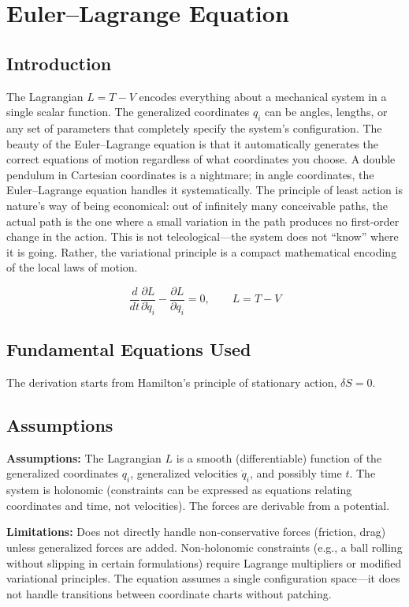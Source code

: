 \chapter{Euler--Lagrange Equation}

\section*{Introduction}

The Lagrangian $L = T - V$ encodes everything about a mechanical system in a single scalar function. The generalized coordinates $q_i$ can be angles, lengths, or any set of parameters that completely specify the system's configuration. The beauty of the Euler--Lagrange equation is that it automatically generates the correct equations of motion regardless of what coordinates you choose. A double pendulum in Cartesian coordinates is a nightmare; in angle coordinates, the Euler--Lagrange equation handles it systematically. The principle of least action is nature's way of being economical: out of infinitely many conceivable paths, the actual path is the one where a small variation in the path produces no first-order change in the action. This is not teleological---the system does not ``know'' where it is going. Rather, the variational principle is a compact mathematical encoding of the local laws of motion.


\[
\frac{d}{dt}\frac{\partial L}{\partial \dot{q}_i}-\frac{\partial L}{\partial q_i}=0,\qquad L=T-V
\]

\section*{Fundamental Equations Used}

The derivation starts from Hamilton's principle of stationary action, $\delta S = 0$.

\section*{Assumptions}

\textbf{Assumptions:} The Lagrangian $L$ is a smooth (differentiable) function of the generalized coordinates $q_i$, generalized velocities $\dot{q}_i$, and possibly time $t$. The system is holonomic (constraints can be expressed as equations relating coordinates and time, not velocities). The forces are derivable from a potential.


\textbf{Limitations:} Does not directly handle non-conservative forces (friction, drag) unless generalized forces are added. Non-holonomic constraints (e.g., a ball rolling without slipping in certain formulations) require Lagrange multipliers or modified variational principles. The equation assumes a single configuration space---it does not handle transitions between coordinate charts without patching.



